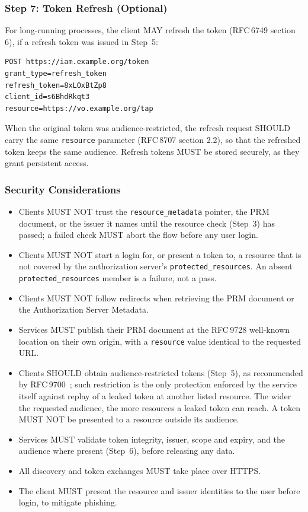 \documentclass[11pt,a4paper]{ivoa}
\newcommand{\rfc}[1]{RFC\,#1}
\begin{document}
\subsubsection{Step 7: Token Refresh (Optional)}

For long-running processes, the client MAY refresh the token (\rfc{6749}
section 6), if a refresh token was issued in Step~5:

\begin{verbatim}
POST https://iam.example.org/token
grant_type=refresh_token
refresh_token=8xLOxBtZp8
client_id=s6BhdRkqt3
resource=https://vo.example.org/tap
\end{verbatim}

When the original token was audience-restricted, the refresh request SHOULD
carry the same \verb|resource| parameter (\rfc{8707} section 2.2), so that the
refreshed token keeps the same audience. Refresh tokens MUST be stored
securely, as they grant persistent access.

\subsubsection{Security Considerations}

\begin{itemize}
\item Clients MUST NOT trust the \verb|resource_metadata| pointer, the PRM
      document, or the issuer it names until the resource check (Step~3) has
      passed; a failed check MUST abort the flow before any user login.
\item Clients MUST NOT start a login for, or present a token to, a resource
      that is not covered by the authorization server's
      \verb|protected_resources|. An absent \verb|protected_resources| member
      is a failure, not a pass.
\item Clients MUST NOT follow redirects when retrieving the PRM document or the
      Authorization Server Metadata.
\item Services MUST publish their PRM document at the \rfc{9728}
      well-known location on their own origin, with a \verb|resource| value
      identical to the requested URL.
\item Clients SHOULD obtain audience-restricted tokens (Step~5), as recommended
      by \rfc{9700}~\citep{std:RFC9700}; such restriction is the only protection enforced by the
      service itself against replay of a leaked token at another listed
      resource. The wider the requested audience, the more resources a leaked
      token can reach. A token MUST NOT be presented to a resource outside its
      audience.
\item Services MUST validate token integrity, issuer, scope and expiry, and the
      audience where present (Step~6), before releasing any data.
\item All discovery and token exchanges MUST take place over HTTPS.
\item The client MUST present the resource and issuer identities to the user
      before login, to mitigate phishing.
\end{itemize}
\appendix
\end{document}
